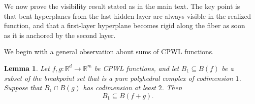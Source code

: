 \documentclass{article}
\newtheorem{lemma}[theorem]{Lemma}
\theoremstyle{definition}
\newcommand{\R}{\mathbb{R}}
\newcommand{\breakpoints}[1]{B({#1})}
\begin{document}
We now prove the visibility result stated as  in the main text.
The key point is that bent hyperplanes from the last hidden layer are always visible in the realized
function, and that a first-layer hyperplane becomes rigid along the fiber as soon as it is anchored
by the second layer.

We begin with a general observation about sums of CPWL functions.

\begin{lemma}
\label{lem:unionofbreakpoints}
Let $f,g \colon \R^d \to \R^m$ be CPWL functions, and let
$B_1 \subseteq \breakpoints{f}$ be a subset of the breakpoint set that is a pure polyhedral complex of codimension $1$. Suppose that $B_1 \cap \breakpoints{g}$ has codimension at least $2$. 
Then
\[
B_1  \subseteq \breakpoints{f+g}.
\]
\end{lemma}
\end{document}
